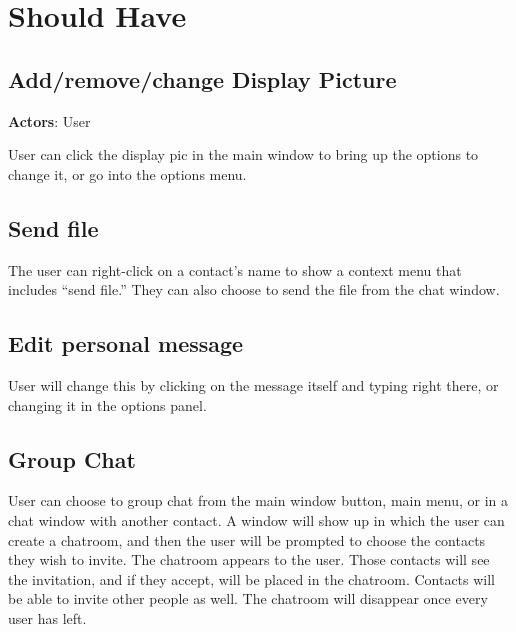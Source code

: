 \section{Should Have}

\subsection{Add/remove/change Display Picture}

{\bf Actors}: User

User can click the display pic in the main window to bring up the options to change it, or go into the options menu.

\subsection{Send file}

The user can right-click on a contact’s name to show a context menu that includes “send file.” They can also choose to send the file from the chat window.

\subsection{Edit personal message}

User will change this by clicking on the message itself and typing right there, or changing it in the options panel.

\subsection{Group Chat}

User can choose to group chat from the main window button, main menu, or in a chat window with another contact. A window will show up in which the user can create a chatroom, and then the user will be prompted to choose the contacts they wish to invite. The chatroom appears to the user. Those contacts will see the invitation, and if they accept, will be placed in the chatroom. Contacts will be able to invite other people as well. The chatroom will disappear once every user has left.
